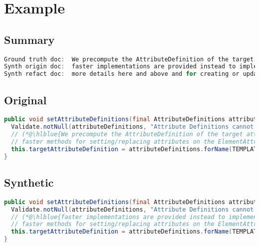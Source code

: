 \documentclass[11pt]{article}
\DeclareRobustCommand{\hlblue}[1]{{\sethlcolor{SeaGreen}\hl{#1}}}
\DeclareRobustCommand{\hlblue}[1]{{\sethlcolor{SkyBlue}\hl{#1}}}
\begin{document}

\section{Example}

\subsection{Summary}
\begin{lstlisting}[language=java]
Ground truth doc:  We precompute the AttributeDefinition of the target attribute in order to being able to use much
Synth origin doc:  faster implementations are provided instead to implement additional and more sophisticated or intuitive or useful but
Synth refact doc:  more details here and above and for creating or updating elements are two or fewer than
\end{lstlisting}

\subsection{Original}
\begin{lstlisting}[language=java]
public void setAttributeDefinitions(final AttributeDefinitions attributeDefinitions) {
  Validate.notNull(attributeDefinitions, "Attribute Definitions cannot be null");
  // (*@\hlblue{We precompute the AttributeDefinition of the target attribute in order to being able to use much}@*)
  // faster methods for setting/replacing attributes on the ElementAttributes implementation
  this.targetAttributeDefinition = attributeDefinitions.forName(TEMPLATE_MODE, TARGET_ATTR_NAME);
}
\end{lstlisting}
\subsection{Synthetic}
\begin{lstlisting}[language=java]
public void setAttributeDefinitions(final AttributeDefinitions attributeDefinitions) {
  Validate.notNull(attributeDefinitions, "Attribute Definitions cannot be null");
  // (*@\hlblue{faster implementations are provided instead to implement additional and more sophisticated or intuitive or useful}@*)
  // faster methods for setting/replacing attributes on the ElementAttributes implementation
  this.targetAttributeDefinition = attributeDefinitions.forName(TEMPLATE_MODE, TARGET_ATTR_NAME);
}
\end{lstlisting}
\end{document}
